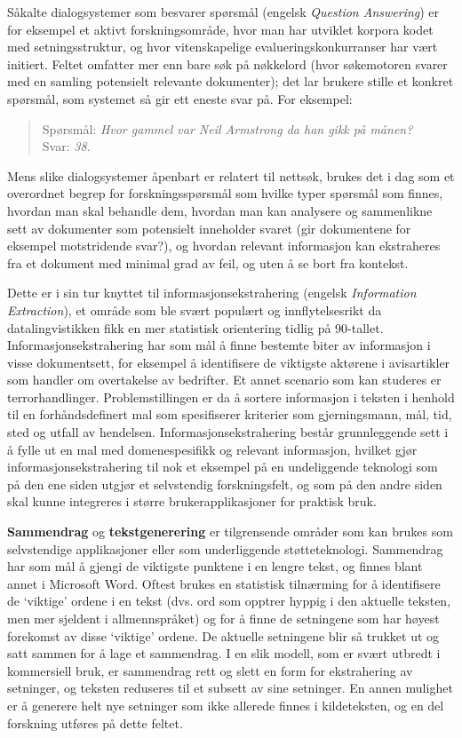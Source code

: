 \begin{multicols}{2}
Såkalte dialogsystemer som besvarer spørsmål (engelsk \textit{Question Answering}) er for eksempel et aktivt forskningsområde, hvor man har utviklet korpora kodet med setningsstruktur, og hvor vitenskapelige evalueringskonkurranser har vært initiert. Feltet omfatter mer enn bare søk på nøkkelord (hvor søkemotoren svarer med en samling potensielt relevante dokumenter); det lar brukere stille et konkret spørsmål, som systemet så gir ett eneste svar på. For eksempel:

\begin{quote}
Spørsmål: \textit{Hvor gammel var Neil Armstrong da han gikk på månen?}\\
Svar: \textit{38.}
\end{quote}

Mens slike dialogsystemer åpenbart er relatert til nettsøk, brukes det i dag som et overordnet begrep for forskningsspørsmål som hvilke typer spørsmål som finnes, hvordan man skal behandle dem, hvordan man kan analysere og sammenlikne sett av dokumenter som potensielt inneholder svaret (gir dokumentene for eksempel motstridende svar?), og hvordan relevant informasjon kan ekstraheres fra et dokument med minimal grad av feil, og uten å se bort fra kontekst.

Dette er i sin tur knyttet til informasjonsekstrahering (engelsk \textit{Information Extraction}), et område som ble svært populært og innflytelsesrikt da datalingvistikken fikk en mer statistisk orientering tidlig på 90-tallet. Informasjonsekstrahering har som mål å finne bestemte biter av informasjon i visse dokumentsett,  for eksempel å identifisere de viktigste aktørene i avisartikler som handler om overtakelse av bedrifter. Et annet scenario som kan studeres er terrorhandlinger. Problemstillingen er da å sortere informasjon i teksten i henhold til en forhåndsdefinert mal som spesifiserer kriterier som gjerningsmann, mål, tid, sted og utfall av hendelsen. Informasjonsekstrahering består grunnleggende sett i å fylle ut en mal med domenespesifikk og relevant informasjon, hvilket gjør informasjonsekstrahering til nok et eksempel på en undeliggende teknologi som  på den ene siden utgjør et selvstendig forskningsfelt, og som på den andre siden skal kunne integreres i større brukerapplikasjoner for praktisk bruk.

\textbf{Sammendrag} og \textbf{tekstgenerering} er tilgrensende områder som kan brukes som selvstendige applikasjoner eller som underliggende støtteteknologi. Sammendrag har som mål å gjengi de viktigste punktene i en lengre tekst, og finnes blant annet i Microsoft Word. Oftest brukes en statistisk tilnærming for å identifisere de `viktige' ordene i en tekst (dvs. ord som opptrer hyppig i den aktuelle teksten, men mer sjeldent i allmennspråket) og for å finne de setningene som har høyest forekomst av disse `viktige' ordene. De aktuelle setningene blir så trukket ut og satt sammen for å lage et sammendrag. I en slik modell, som er svært utbredt i kommersiell bruk, er sammendrag rett og slett en form for ekstrahering av setninger, og teksten reduseres til et subsett av sine setninger. En annen mulighet er å generere helt nye setninger som ikke allerede finnes i kildeteksten, og en del forskning utføres på dette feltet.


\end{multicols}

